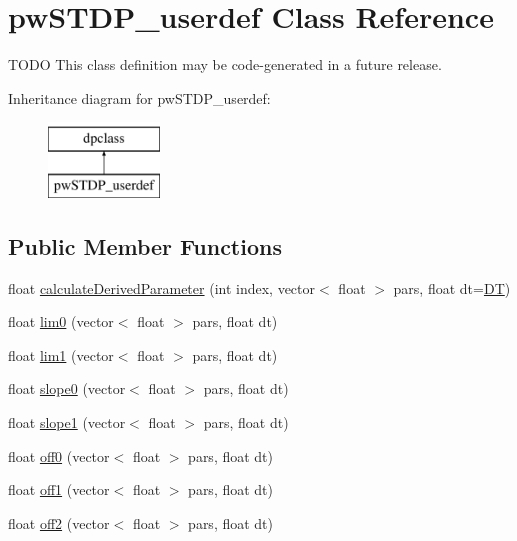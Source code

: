 \hypertarget{classpwSTDP__userdef}{\section{pw\+S\+T\+D\+P\+\_\+userdef Class Reference}
\label{classpwSTDP__userdef}
}


T\+O\+D\+O This class definition may be code-\/generated in a future release.  


Inheritance diagram for pw\+S\+T\+D\+P\+\_\+userdef\+:\begin{figure}[H]
\begin{center}
\leavevmode
\includegraphics[height=2.000000cm]{dd/d4e/classpwSTDP__userdef}
\end{center}
\end{figure}
\subsection*{Public Member Functions}
\begin{DoxyCompactItemize}
\item 
float \hyperlink{classpwSTDP__userdef_ab97adaaca41c96af7bcb70cde27f36cf}{calculate\+Derived\+Parameter} (int index, vector$<$ float $>$ pars, float dt=\hyperlink{SynDelaySim_8h_a943f07034774ef1261d62cd0d3d1fec9}{D\+T})
\item 
float \hyperlink{classpwSTDP__userdef_a649e7e3b89a6e25d1c967c85256be22b}{lim0} (vector$<$ float $>$ pars, float dt)
\item 
float \hyperlink{classpwSTDP__userdef_a98ed2b584c1e81b3e2a6b5620d6b3e2b}{lim1} (vector$<$ float $>$ pars, float dt)
\item 
float \hyperlink{classpwSTDP__userdef_ade34631db70b55575170413dd9b57cd0}{slope0} (vector$<$ float $>$ pars, float dt)
\item 
float \hyperlink{classpwSTDP__userdef_a3a84bdf1197c357c3e7623bee86d42d6}{slope1} (vector$<$ float $>$ pars, float dt)
\item 
float \hyperlink{classpwSTDP__userdef_a45894552b5ce5311656444c4350c6a83}{off0} (vector$<$ float $>$ pars, float dt)
\item 
float \hyperlink{classpwSTDP__userdef_a07081d6b97c97073e9c65f48f7a2698b}{off1} (vector$<$ float $>$ pars, float dt)
\item 
float \hyperlink{classpwSTDP__userdef_a20a787ad267031b280618afc0646dc15}{off2} (vector$<$ float $>$ pars, float dt)
\end{DoxyCompactItemize}


